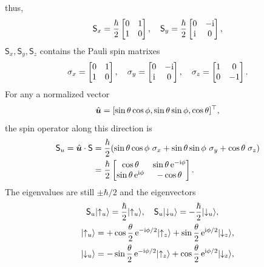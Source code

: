 \documentclass{article}
\newcommand*{\op}[1]{\mathsf{#1}}
\begin{document}
thus,
\begin{align*}
	\op{S}_x=\frac{\hbar}2\begin{bmatrix}0&1\\1&0\end{bmatrix},\quad
	\op{S}_y=\frac{\hbar}2\begin{bmatrix}0&-\i\\\i&0\end{bmatrix},
\end{align*}
$\op{S}_x,\op{S}_y,\op{S}_z$ contains the Pauli spin matrixes
\begin{align*}
	\sigma_x=\begin{bmatrix}0&1\\1&0\end{bmatrix},\quad
	\sigma_y=\begin{bmatrix}0&-\mathrm{i}\\\mathrm{i}&0\end{bmatrix},\quad
	\sigma_z=\begin{bmatrix}1&0\\0&-1\end{bmatrix}.
\end{align*}
For any a normalized vector
$$\mathop{}\!\hat{\bm{u}}=[\sin\theta\cos\phi,\sin\theta\sin\phi,\cos\theta]^\top,$$
the spin operator along this direction is
\begin{align*}
	\op{S}_u=\uvec{u}\cdot\op{S} & =\frac{\hbar}2(\sin\theta\cos\phi~\sigma_x+\sin\theta\sin\phi~\sigma_y+\cos\theta\;\sigma_z) \\
	                          & =\frac{\hbar}2\begin{bmatrix}\cos\theta&\sin\theta \e^{-\i\phi}\\\sin\theta \e^{\i\phi}&-\cos\theta\end{bmatrix}.
\end{align*}
The eigenvalues are still $\pm\hbar/2$ and the eigenvectors
\begin{align*}
	\op{S}_u      & \ket{\uparrow_u}=\frac{\hbar}2\ket{\uparrow_u},\quad\op{S}_u\ket{\downarrow_u}=-\frac{\hbar}2\ket{\downarrow_u},   \\
	\ket{\uparrow_u} & =+\cos\frac{\theta}2\e^{-\i\phi/2}\ket{\uparrow_z}+\sin\frac{\theta}2\e^{\i\phi/2}\ket{\downarrow_z}, \\
	\ket{\downarrow_u} & =-\sin\frac{\theta}2\e^{-\i\phi/2}\ket{\uparrow_z}+\cos\frac{\theta}2\e^{\i\phi/2}\ket{\downarrow_z},
\end{align*}
\end{document}
